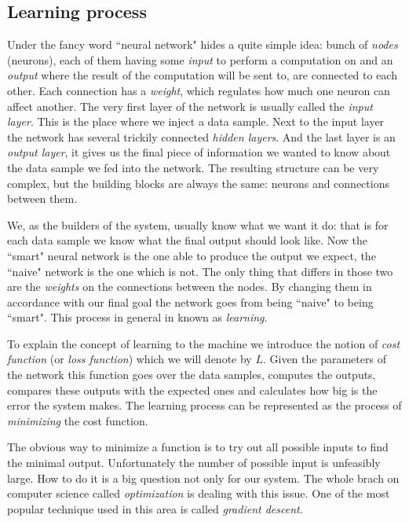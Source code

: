 \documentclass[a4paper,12pt]{article}
\begin{document}
\subsection{Learning process}
\label{sec:learningprocess}
Under the fancy word ``neural network" hides a quite simple idea: bunch of \emph{nodes} (neurons), each of them having some \emph{input} to perform a computation on and an \emph{output} where the result of the computation will be sent to, are connected to each other. Each connection has a \emph{weight}, which regulates how much one neuron can affect another. The very first layer of the network is usually called the \emph{input layer}. This is the place where we inject a data sample. Next to the input layer the network has several trickily connected \emph{hidden layers}. And the last layer is an \emph{output layer}, it gives us the final piece of information we wanted to know about the data sample we fed into the network. The resulting structure can be very complex, but the building blocks are always the same: neurons and connections between them.

We, as the builders of the system, usually know what we want it do: that is for each data sample we know what the final output should look like. Now the ``smart" neural network is the one able to produce the output we expect, the ``naive" network is the one which is not. The only thing that differs in those two are the \emph{weights} on the connections between the nodes. By changing them in accordance with our final goal the network goes from being ``naive" to being ``smart". This process in general in known as \emph{learning}.

To explain the concept of learning to the machine we introduce the notion of \emph{cost function} (or \emph{loss function}) which we will denote by $L$. Given the parameters of the network this function goes over the data samples, computes the outputs, compares these outputs with the expected ones and calculates how big is the error the system makes. The learning process can be represented as the process of \emph{minimizing} the cost function.

The obvious way to minimize a function is to try out all possible inputs to find the minimal output. Unfortunately the number of possible input is unfeasibly large. How to do it is a big question not only for our system. The whole brach on computer science called \emph{optimization} is dealing with this issue. One of the most popular technique used in this area is called \emph{gradient descent}.
\end{document}
